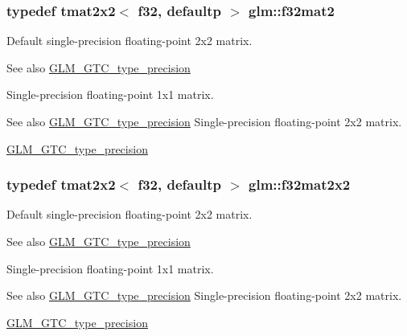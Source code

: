 \subsubsection[{f32mat2}]{\setlength{\rightskip}{0pt plus 5cm}typedef tmat2x2$<$ f32, defaultp $>$ {\bf glm\+::f32mat2}}\label{group__gtc__type__precision_ga29b40a1141234160a627a540eceedd31}
Default single-\/precision floating-\/point 2x2 matrix. \begin{DoxySeeAlso}{See also}
\hyperlink{group__gtc__type__precision}{G\+L\+M\+\_\+\+G\+T\+C\+\_\+type\+\_\+precision}
\end{DoxySeeAlso}
Single-\/precision floating-\/point 1x1 matrix. \begin{DoxySeeAlso}{See also}
\hyperlink{group__gtc__type__precision}{G\+L\+M\+\_\+\+G\+T\+C\+\_\+type\+\_\+precision} Single-\/precision floating-\/point 2x2 matrix. 

\hyperlink{group__gtc__type__precision}{G\+L\+M\+\_\+\+G\+T\+C\+\_\+type\+\_\+precision} 
\end{DoxySeeAlso}
\hypertarget{group__gtc__type__precision_gae7ebbb68656a5fd879d536b5d8452fb1}{}
\subsubsection[{f32mat2x2}]{\setlength{\rightskip}{0pt plus 5cm}typedef tmat2x2$<$ f32, defaultp $>$ {\bf glm\+::f32mat2x2}}\label{group__gtc__type__precision_gae7ebbb68656a5fd879d536b5d8452fb1}
Default single-\/precision floating-\/point 2x2 matrix. \begin{DoxySeeAlso}{See also}
\hyperlink{group__gtc__type__precision}{G\+L\+M\+\_\+\+G\+T\+C\+\_\+type\+\_\+precision}
\end{DoxySeeAlso}
Single-\/precision floating-\/point 1x1 matrix. \begin{DoxySeeAlso}{See also}
\hyperlink{group__gtc__type__precision}{G\+L\+M\+\_\+\+G\+T\+C\+\_\+type\+\_\+precision} Single-\/precision floating-\/point 2x2 matrix. 

\hyperlink{group__gtc__type__precision}{G\+L\+M\+\_\+\+G\+T\+C\+\_\+type\+\_\+precision} 
\end{DoxySeeAlso}
\hypertarget{group__gtc__type__precision_gac4573d3d213b2bce23943caef565a211}{}
